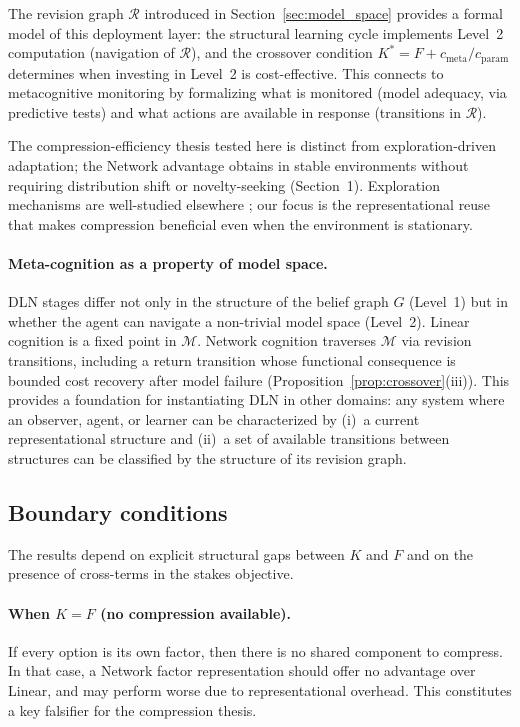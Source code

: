 \documentclass[11pt]{article}
\begin{document}
The revision graph $\mathcal{R}$ introduced in Section~\ref{sec:model_space}
provides a formal model of this deployment layer: the structural learning cycle
implements Level~2 computation (navigation of $\mathcal{R}$), and the crossover
condition $K^* = F + c_{\mathrm{meta}}/c_{\mathrm{param}}$ determines when
investing in Level~2 is cost-effective.  This connects to metacognitive
monitoring \cite{Flavell1979} by formalizing what is monitored (model adequacy,
via predictive tests) and what actions are available in response (transitions in
$\mathcal{R}$).

The compression-efficiency thesis tested here is distinct from exploration-driven
adaptation; the Network advantage obtains in stable environments without
requiring distribution shift or novelty-seeking (Section~1). Exploration
mechanisms are well-studied elsewhere \cite{Gershman2018,RussoBandits2018}; our
focus is the representational reuse that makes compression beneficial even when
the environment is stationary.

\paragraph{Meta-cognition as a property of model space.}
DLN stages differ not only in the structure of the belief graph $G$ (Level~1)
but in whether the agent can navigate a non-trivial model space (Level~2).
Linear cognition is a fixed point in $\mathcal{M}$.  Network cognition traverses
$\mathcal{M}$ via revision transitions, including a return transition whose
functional consequence is bounded cost recovery after model failure
(Proposition~\ref{prop:crossover}(iii)).  This provides a foundation for
instantiating DLN in other domains: any system where an observer, agent, or
learner can be characterized by (i)~a current representational structure and
(ii)~a set of available transitions between structures can be classified by the
structure of its revision graph.

\subsection{Boundary conditions}

The results depend on explicit structural gaps between $K$ and $F$ and on the presence of cross-terms in the stakes objective.

\paragraph{When $K=F$ (no compression available).}
If every option is its own factor, then there is no shared component to compress. In that case, a Network factor representation should offer no advantage over Linear, and may perform worse due to representational overhead. This constitutes a key falsifier for the compression thesis.
\end{document}

